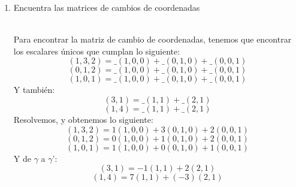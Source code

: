 \begin{enumerate}
    \item Encuentra las matrices de cambios de coordenadas 

    \noindent \solucion \\

    Para encontrar la matriz de cambio de coordenadas, tenemos que encontrar los escalares únicos que cumplan lo siguiente:
        \begin{equation*}
            (1, 3, 2)= \_(1,0,0)+\_(0,1,0)+\_(0,0,1)
        \end{equation*}
        \begin{equation*}
        (0, 1, 2)= \_(1,0,0)+\_(0,1,0)+\_(0,0,1)
        \end{equation*}
        \begin{equation*}
            (1, 0, 1)= \_(1,0,0)+\_(0,1,0)+\_(0,0,1)
        \end{equation*}
        Y también:
        \begin{equation*}
            (3, 1)=\_(1, 1)+\_(2, 1)
        \end{equation*}
        \begin{equation*}
            (1, 4)=\_(1, 1)+\_(2, 1)
        \end{equation*}
        Resolvemos, y obtenemos lo siguiente:
        \begin{equation*}
            (1, 3, 2)= 1(1,0,0)+3(0,1,0)+2(0,0,1)
        \end{equation*}
        \begin{equation*}
        (0, 1, 2)= 0(1,0,0)+1(0,1,0)+2(0,0,1)
        \end{equation*}
        \begin{equation*}
            (1, 0, 1)= 1(1,0,0)+0(0,1,0)+1(0,0,1)
        \end{equation*}
        Y de $\gamma$ a $\gamma$':
        \begin{equation*}
            (3, 1)=-1(1, 1)+2(2, 1)
        \end{equation*}
        \begin{equation*}
            (1, 4)=7(1, 1)+(-3)(2, 1)

\end{equation*}
\end{enumerate}
